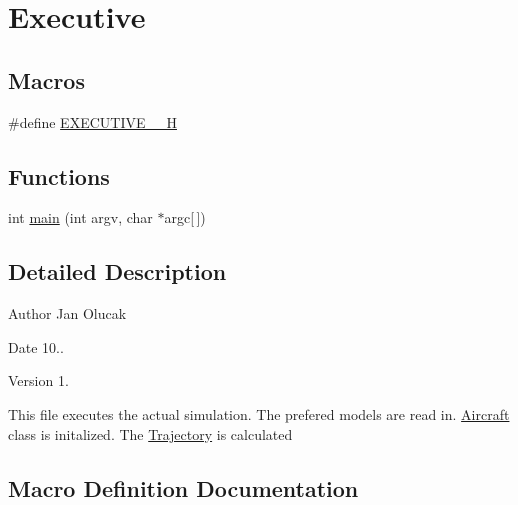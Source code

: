 \hypertarget{group___executive}{}\section{Executive}
\label{group___executive}
\subsection*{Macros}
\begin{DoxyCompactItemize}
\item 
\#define \hyperlink{group___executive_ga9c58512ec990b4a3bb660c7f1f565373}{E\+X\+E\+C\+U\+T\+I\+V\+E\+\_\+\+\_\+H}
\end{DoxyCompactItemize}
\subsection*{Functions}
\begin{DoxyCompactItemize}
\item 
int \hyperlink{group___executive_gac4c0f8a8146b128f1b8f920e3a9c3b1e}{main} (int argv, char $\ast$argc\mbox{[}$\,$\mbox{]})
\end{DoxyCompactItemize}


\subsection{Detailed Description}
\begin{DoxyAuthor}{Author}
Jan Olucak 
\end{DoxyAuthor}
\begin{DoxyDate}{Date}
10.. 
\end{DoxyDate}
\begin{DoxyVersion}{Version}
1.
\end{DoxyVersion}
This file executes the actual simulation. The prefered models are read in. \hyperlink{class_aircraft}{Aircraft} class is initalized. The \hyperlink{class_trajectory}{Trajectory} is calculated 

\subsection{Macro Definition Documentation}
\mbox{\label{group___executive_ga9c58512ec990b4a3bb660c7f1f565373}} 
